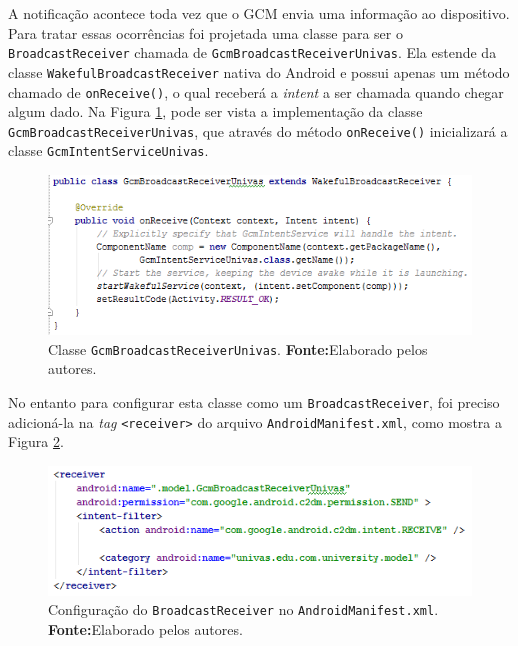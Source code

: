 	\pagebreak
	
	\par A notificação acontece toda vez que o GCM envia uma informação ao
dispositivo. Para tratar essas ocorrências foi projetada uma classe para ser o
\texttt{BroadcastReceiver} chamada de \texttt{GcmBroadcastReceiverUnivas}. Ela
estende da classe \texttt{WakefulBroadcastReceiver} nativa do Android e possui
apenas um método chamado de \texttt{onReceive()}, o qual receberá a
\textit{intent} a ser chamada quando chegar algum dado. Na Figura
\ref{fig:app14}, pode ser vista a implementação da classe
\texttt{GcmBroadcastReceiverUnivas}, que através do método \texttt{onReceive()}
inicializará a classe \texttt{GcmIntentServiceUnivas}.

		\begin{figure}[h!] 
			\centerline{\includegraphics[scale=0.8]{./imagens/2_q_metodologico/4_procedimentos_resultados/42_aplicativo/app14.png}}
			\caption[Classe GcmBroadcastReceiverUnivas]{Classe \texttt{GcmBroadcastReceiverUnivas}.
			\textbf{Fonte:}Elaborado pelos autores.}
			\label{fig:app14}
		\end{figure}
	
	\par No entanto para configurar esta classe como um \texttt{BroadcastReceiver},
foi preciso adicioná-la na \textit{tag} \texttt{<receiver>} do arquivo
\texttt{AndroidManifest.xml}, como mostra a Figura \ref{fig:app15}.

		\begin{figure}[h!] 
			\centerline{\includegraphics[scale=0.8]{./imagens/2_q_metodologico/4_procedimentos_resultados/42_aplicativo/app15.png}}
			\caption[Configuração do BroadcastReceiver no
			AndroidManifest.xml]{Configuração do \texttt{BroadcastReceiver} no
			\texttt{AndroidManifest.xml}.
			\textbf{Fonte:}Elaborado pelos autores.}
			\label{fig:app15}
		\end{figure}
	
